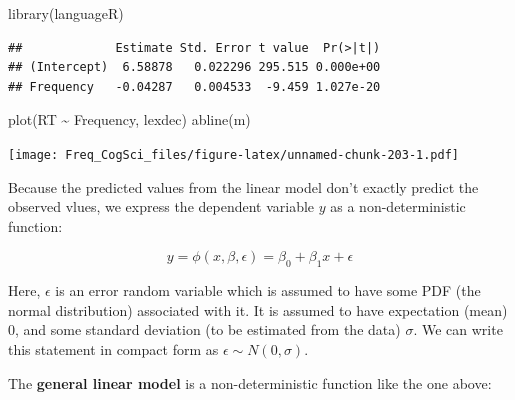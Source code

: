 \documentclass[
  12pt,
]{krantz}
\newenvironment{Shaded}{\begin{snugshade}}{\end{snugshade}}
\newcommand{\FunctionTok}[1]{\textcolor[rgb]{0.00,0.00,0.00}{#1}}
\newcommand{\NormalTok}[1]{#1}
\newcommand{\OtherTok}[1]{\textcolor[rgb]{0.56,0.35,0.01}{#1}}
\newcommand{\SpecialCharTok}[1]{\textcolor[rgb]{0.00,0.00,0.00}{#1}}
\newcommand{\StringTok}[1]{\textcolor[rgb]{0.31,0.60,0.02}{#1}}
\theoremstyle{definition}
\theoremstyle{definition}
\theoremstyle{definition}
\theoremstyle{definition}
\theoremstyle{remark}
\begin{document}
\begin{Shaded}
\begin{Highlighting}[]
\FunctionTok{library}\NormalTok{(languageR)}
\end{Highlighting}
\end{Shaded}

\begin{Shaded}
\end{Shaded}

\begin{verbatim}
##             Estimate Std. Error t value  Pr(>|t|)
## (Intercept)  6.58878   0.022296 295.515 0.000e+00
## Frequency   -0.04287   0.004533  -9.459 1.027e-20
\end{verbatim}

\begin{Shaded}
\begin{Highlighting}[]
\FunctionTok{plot}\NormalTok{(RT }\SpecialCharTok{\textasciitilde{}}\NormalTok{ Frequency, lexdec)}
\FunctionTok{abline}\NormalTok{(m)}
\end{Highlighting}
\end{Shaded}

\texttt{[image: Freq\_CogSci\_files/figure-latex/unnamed-chunk-203-1.pdf]}

Because the predicted values from the linear model don't exactly predict the observed vlues, we express the dependent variable \(y\) as a non-deterministic function:

\begin{equation}
y=\phi(x,\beta,\epsilon)=\beta_0+\beta_1x+\epsilon
\end{equation}

Here, \(\epsilon\) is an error random variable which is assumed to have some PDF (the normal distribution) associated with it.
It is assumed to have expectation (mean) 0, and some standard deviation (to be estimated from the data) \(\sigma\).
We can write this statement in compact form as \(\epsilon \sim N(0,\sigma)\).

The \textbf{general linear model} is a non-deterministic function like the one above:
\end{document}
